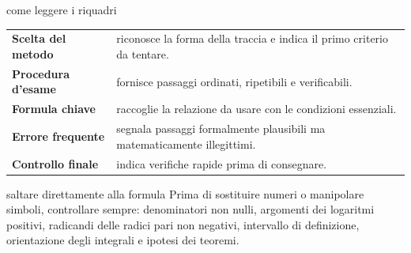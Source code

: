 \begin{sceltametodo}{come leggere i riquadri}
\begin{tabularx}{\textwidth}{@{}>{\bfseries\sffamily}p{}X@{}}
Scelta del metodo & riconosce la forma della traccia e indica il primo criterio da tentare.\\
Procedura d'esame & fornisce passaggi ordinati, ripetibili e verificabili.\\
Formula chiave & raccoglie la relazione da usare con le condizioni essenziali.\\
Errore frequente & segnala passaggi formalmente plausibili ma matematicamente illegittimi.\\
Controllo finale & indica verifiche rapide prima di consegnare.
\end{tabularx}
\end{sceltametodo}

\begin{errorefrequente}{saltare direttamente alla formula}
Prima di sostituire numeri o manipolare simboli, controllare sempre: denominatori non nulli, argomenti dei logaritmi positivi, radicandi delle radici pari non negativi, intervallo di definizione, orientazione degli integrali e ipotesi dei teoremi.
\end{errorefrequente}
